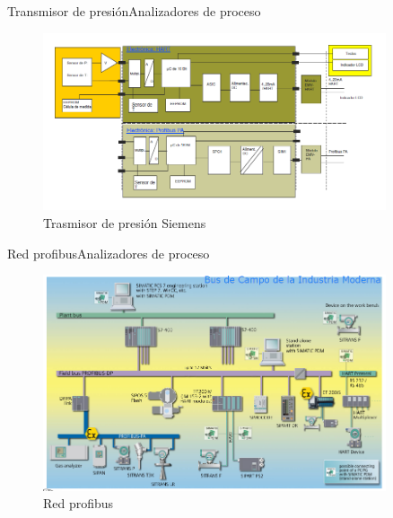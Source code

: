 \documentclass[10pt]{beamer}
\begin{document}
{%
 \begin{frame}{ Transmisor de presión}{Analizadores de proceso}
 \begin{figure}%
\includegraphics[width=0.9\textwidth]{figura_22.png} %
\caption{\label{fig:18} Trasmisor de presión Siemens } %
	\end{figure}
	\end{frame}
 \begin{frame}{ Red profibus}{Analizadores de proceso}
 \begin{figure}%
\includegraphics[width=0.9\textwidth]{figura_23.png} %
\caption{\label{fig:19} Red profibus} %
	\end{figure}
	\end{frame}
}
\end{document}

